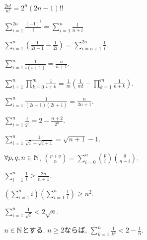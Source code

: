 \begin{prop}
  $\frac{2n!}{n!}=2^n(2n-1)!!$
\end{prop}

\begin{prop}
  $\sum_{i=1}^{2n}\frac{(-1)^i}{i}=\sum_{i=1}^n\frac{1}{n+i}$
\end{prop}

\begin{prop}
  $\sum_{i=1}^n\left( \frac{1}{2i-1}-\frac{1}{2i}\right)=\sum_{i=n+1}^{2n}\frac{1}{i}$.
\end{prop}

\begin{prop}
  $\sum_{i=1}^n\frac{1}{i(i+1)}=\frac{n}{n+1}$.
\end{prop}

\begin{prop}
  $\sum_{i=1}^n\prod_{k=0}^{m}\frac{1}{i+k}=\frac{1}{m}\left(\frac{1}{m!}-\prod_{k=1}^m\frac{1}{n+k}\right)$.
\end{prop}


\begin{prop}
  $\sum_{i=1}^n\frac{1}{(2i-1)(2i+1)}=\frac{n}{2n+1}$.
\end{prop}

\begin{prop}
  $\sum_{i=1}^n\frac{i}{2^i}=2-\frac{n+2}{2^n}$.
\end{prop}


\begin{prop}
  $\sum_{i=1}^n \frac{1}{\sqrt{i}+\sqrt{i+1}}=\sqrt{n+1}-1$.
\end{prop}

\begin{prop}
  $\forall p,q,n\in\mathbb{N}$,
  $\binom{p+q}{n}=\sum_{i=0}^n\binom{p}{i}\binom{q}{n-i}$.
\end{prop}


\begin{prop}
$\sum_{i=1}^{n}\frac{1}{i}\geq \frac{2n}{n+1}$.
\end{prop}

\begin{prop}
$\left(\sum_{i=1}^{n}i\right)\left(\sum_{i=1}^{n}\frac{1}{i}\right)\geq n^2$.
\end{prop}

\begin{prop}
$\sum_{i=1}^{n}\frac{1}{\sqrt{i}}<2\sqrt{n}$.
\end{prop}

\begin{prop}
$n\in\mathbb{N}$とする.
  $n\geq 2$ならば, $\sum_{k=1}^n\frac{1}{k^2} < 2-\frac{1}{n}$.
\end{prop}

